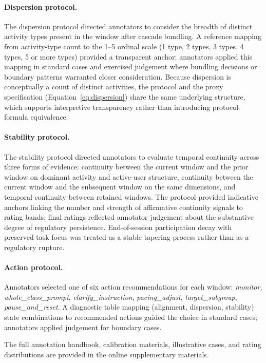 \documentclass[preprint,12pt,authoryear]{elsarticle}
\begin{document}
\paragraph{Dispersion protocol.}
The dispersion protocol directed annotators to consider the breadth of distinct activity types present in the window after cascade bundling. A reference mapping from activity-type count to the 1--5 ordinal scale (1 type, 2 types, 3 types, 4 types, 5 or more types) provided a transparent anchor; annotators applied this mapping in standard cases and exercised judgement where bundling decisions or boundary patterns warranted closer consideration. Because dispersion is conceptually a count of distinct activities, the protocol and the proxy specification (Equation~\ref{eq:dispersion}) share the same underlying structure, which supports interpretive transparency rather than introducing protocol-formula equivalence.

\paragraph{Stability protocol.}
The stability protocol directed annotators to evaluate temporal continuity across three forms of evidence: continuity between the current window and the prior window on dominant activity and active-user structure, continuity between the current window and the subsequent window on the same dimensions, and temporal continuity between retained windows. The protocol provided indicative anchors linking the number and strength of affirmative continuity signals to rating bands; final ratings reflected annotator judgement about the substantive degree of regulatory persistence. End-of-session participation decay with preserved task focus was treated as a stable tapering process rather than as a regulatory rupture.

\paragraph{Action protocol.}
Annotators selected one of six action recommendations for each window: \textit{monitor}, \textit{whole\_class\_prompt}, \textit{clarify\_instruction}, \textit{pacing\_adjust}, \textit{target\_subgroup}, \textit{pause\_and\_reset}. A diagnostic table mapping (alignment, dispersion, stability) state combinations to recommended actions guided the choice in standard cases; annotators applied judgement for boundary cases.

The full annotation handbook, calibration materials, illustrative cases, and rating distributions are provided in the online supplementary materials.
\end{document}
